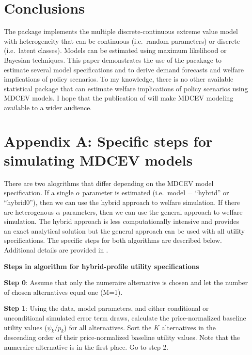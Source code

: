 \hypertarget{conclusions}{%
\section{Conclusions}\label{conclusions}}

The  package implements the multiple discrete-continuous
extreme value model with heterogeneity that can be continuous
(i.e.~random parameters) or discrete (i.e.~latent classes). Models can
be estimated using maximum likelihood or Bayesian techniques. This paper
demonstrates the use of the pacakage to estimate several model
specifications and to derive demand forecasts and welfare implications
of policy scenarios. To my knowledge, there is no other available
statistical package that can estimate welfare implications of policy
scenarios using MDCEV models. I hope that the publication of
 will make MDCEV modeling available to a wider audience.

\hypertarget{appendix-a-specific-steps-for-simulating-mdcev-models}{%
\section*{Appendix A: Specific steps for simulating MDCEV
models}\label{appendix-a-specific-steps-for-simulating-mdcev-models}}

There are two alogrithms that differ depending on the MDCEV model
specification. If a single \(\alpha\) parameter is estimated (i.e.~model
= ``hybrid'' or ``hybrid0''), then we can use the hybrid approach to
welfare simulation. If there are heterogenous \(\alpha\) parameters,
then we can use the general approach to welfare simulation. The hybrid
approach is less computationally intensive and provides an exact
analytical solution but the general approach can be used with all
utility specifications. The specific steps for both algorithms are
described below. Additional details are provided in
\citet{lloydsmithnew2018}.

\textbf{Steps in algorithm for hybrid-profile utility specifications}

\textbf{Step 0}: Assume that only the numeraire alternative is chosen
and let the number of chosen alternatives equal one (M=1).

\textbf{Step 1}: Using the data, model parameters, and either
conditional or unconditional simulated error term draws, calculate the
price-normalized baseline utility values (\(\psi_k/p_k\)) for all
alternatives. Sort the \(K\) alternatives in the descending order of
their price-normalized baseline utility values. Note that the numeraire
alternative is in the first place. Go to step 2.

